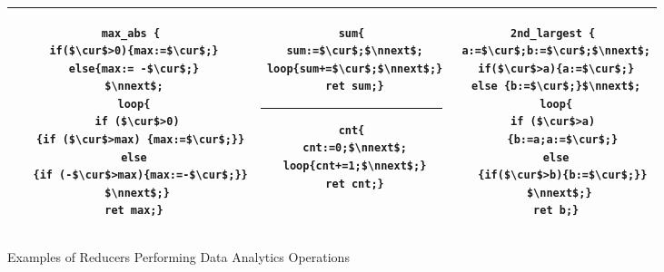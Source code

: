 \begin{figure}
	\centering
	\lstset{language=C,
		basicstyle=\ttfamily\scriptsize}
	\begin{tabular}{|c|c|c|}
		\hline
		\begin{minipage}[t]{0.39\textwidth}
		\vspace{-0.5cm}
			\begin{lstlisting}[mathescape=true]
max_abs {
 if($\cur$>0){max:=$\cur$;}
 else{max:= -$\cur$;}
 $\nnext$;
 loop{
  if ($\cur$>0)
   {if ($\cur$>max) {max:=$\cur$;}}
  else 
   {if (-$\cur$>max){max:=-$\cur$;}}
  $\nnext$;}
 ret max;}
	\end{lstlisting}
		\end{minipage}&
		\begin{minipage}[t]{0.27\textwidth}
		\vspace{-0.5cm}
			\begin{lstlisting}[mathescape=true]
sum{
 sum:=$\cur$;$\nnext$;
 loop{sum+=$\cur$;$\nnext$;}
 ret sum;}
			\end{lstlisting}
\hrule\vspace{0.1cm}%
			\begin{lstlisting}[mathescape=true]
cnt{
 cnt:=0;$\nnext$;
 loop{cnt+=1;$\nnext$;}
 ret cnt;}
			\end{lstlisting}			
		\end{minipage}&
		\begin{minipage}[t]{0.30\textwidth}
		\vspace{-0.5cm}			
			\begin{lstlisting}[mathescape=true]
2nd_largest {
 a:=$\cur$;b:=$\cur$;$\nnext$;
 if($\cur$>a){a:=$\cur$;}
 else {b:=$\cur$;}$\nnext$;
 loop{
  if ($\cur$>a)  
   {b:=a;a:=$\cur$;}
  else 
   {if($\cur$>b){b:=$\cur$;}}
  $\nnext$;}
 ret b;}
			\end{lstlisting}		
		\end{minipage}\\
		\hline		
	\end{tabular}
	\caption{Examples of Reducers Performing Data Analytics Operations}
	\label{fig:examples}
\end{figure}
\vspace{-0.5cm}
